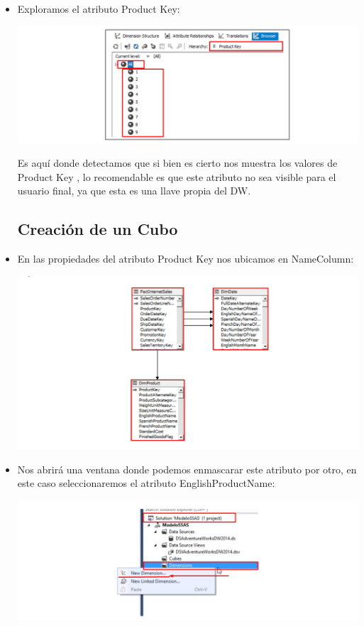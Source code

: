 \begin{itemize}
\item  Exploramos el atributo Product Key:

	\begin{center}
	\includegraphics[width=\columnwidth]{./Imagenes/img22}
    \end{center}	
   
Es aquí donde detectamos que si bien es cierto nos muestra los valores de Product Key , lo recomendable
es que este atributo no sea visible para el usuario final, ya que esta es una llave propia del DW.

\subsection{Creación de un Cubo}


\item En las propiedades del atributo Product Key nos ubicamos en NameColumn:

	\begin{center}
	\includegraphics[width=\columnwidth]{./Imagenes/img1_3}
	\end{center}	

\item Nos abrirá una ventana donde podemos enmascarar este atributo por otro, en este caso seleccionaremos el
atributo EnglishProductName:

	\begin{center}
	\includegraphics[width=\columnwidth]{./Imagenes/img2_3}
	\end{center}	



\end{itemize}
